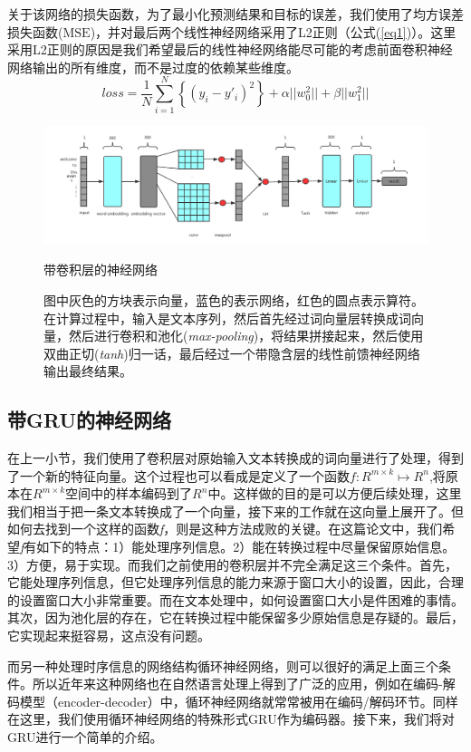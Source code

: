 \documentclass[12pt]{template}
\begin{document}
关于该网络的损失函数，为了最小化预测结果和目标的误差，我们使用了均方误差损失函数($\mathrm{MSE}$)，并对最后两个线性神经网络采用了L2正则（公式(\ref{eq1})）。这里采用L2正则的原因是我们希望最后的线性神经网络能尽可能的考虑前面卷积神经网络输出的所有维度，而不是过度的依赖某些维度。
\begin{equation}\label{eq1}
loss=\frac{1}{N}\displaystyle\sum_{i=1}^{N}\left\{(y_i-y'_i)^2\right\}+\alpha||w_0^2||+\beta||w_1^2||
\end{equation}
\begin{figure}[htb]
    \centering
    \includegraphics[width=16cm]{conv_ranker.png}
    \caption{带卷积层的神经网络}
    \captionsetup{font=footnotesize,margin=30pt}\caption*{图中灰色的方块表示向量，蓝色的表示网络，红色的圆点表示算符。在计算过程中，输入是文本序列，然后首先经过词向量层转换成词向量，然后进行卷积和池化(\textit{max-pooling})，将结果拼接起来，然后使用双曲正切(\textit{tanh})归一话，最后经过一个带隐含层的线性前馈神经网络输出最终结果。}
    \label{f21}
\end{figure} 

\subsection{带GRU的神经网络}
在上一小节，我们使用了卷积层对原始输入文本转换成的词向量进行了处理，得到了一个新的特征向量。这个过程也可以看成是定义了一个函数\(f:R^{m\times k}\mapsto R^n\),将原本在\(R^{m\times k}\)空间中的样本编码到了\(R^n\)中。这样做的目的是可以方便后续处理，这里我们相当于把一条文本转换成了一个向量，接下来的工作就在这向量上展开了。但如何去找到一个这样的函数\textit{f}，则是这种方法成败的关键。在这篇论文中，我们希望\textit{f}有如下的特点：1）能处理序列信息。2）能在转换过程中尽量保留原始信息。3）方便，易于实现。而我们之前使用的卷积层并不完全满足这三个条件。首先，它能处理序列信息，但它处理序列信息的能力来源于窗口大小的设置，因此，合理的设置窗口大小非常重要。而在文本处理中，如何设置窗口大小是件困难的事情。其次，因为池化层的存在，它在转换过程中能保留多少原始信息是存疑的。最后，它实现起来挺容易，这点没有问题。

而另一种处理时序信息的网络结构循环神经网络，则可以很好的满足上面三个条件。所以近年来这种网络也在自然语言处理上得到了广泛的应用，例如在编码-解码模型（encoder-decoder）中，循环神经网络就常常被用在编码/解码环节。同样在这里，我们使用循环神经网络的特殊形式$\mathrm{GRU}$\cite{DBLP:journals/corr/ChungGCB14}作为编码器。接下来，我们将对GRU进行一个简单的介绍。
\end{document}
